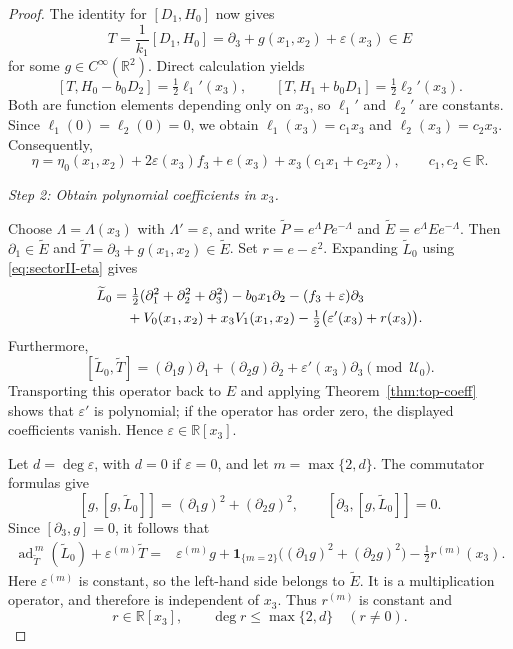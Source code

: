 \documentclass{tCON2e}
\newenvironment{revision}{\begingroup\color{black}}{\endgroup}
\numberwithin{equation}{section}
\theoremstyle{journalplain}
\theoremstyle{journaldef}
\newenvironment{revision}{}{}
\begin{document}
\begin{revision}
\begin{proof}
The identity for $[D_1,H_0]$ now gives
\[
T=\frac1{k_1}[D_1,H_0]
=\partial_3+g(x_1,x_2)+\varepsilon(x_3)\in E
\]
for some $g\in C^\infty(\mathbb R^2)$.
Direct calculation yields
\[
[T,H_0-b_0D_2]=\tfrac12\ell_1'(x_3),
\qquad
[T,H_1+b_0D_1]=\tfrac12\ell_2'(x_3).
\]
Both are function elements depending only on $x_3$,
so $\ell_1'$ and $\ell_2'$ are constants.
Since $\ell_1(0)=\ell_2(0)=0$, we obtain
$\ell_1(x_3)=c_1x_3$ and $\ell_2(x_3)=c_2x_3$.
Consequently,
\begin{equation}
\eta=\eta_0(x_1,x_2)+2\varepsilon(x_3)f_3+e(x_3)
+x_3(c_1x_1+c_2x_2),
\qquad c_1,c_2\in\mathbb R.
\label{eq:sectorII-eta}
\end{equation}

\medskip
\noindent\emph{Step 2: Obtain polynomial coefficients in $x_3$.}

Choose $\Lambda=\Lambda(x_3)$ with $\Lambda'=\varepsilon$,
and write $\widetilde P=e^\Lambda Pe^{-\Lambda}$ and
$\widetilde E=e^\Lambda Ee^{-\Lambda}$.
Then $\partial_1\in\widetilde E$ and
$\widetilde T=\partial_3+g(x_1,x_2)\in\widetilde E$.
Set $r=e-\varepsilon^2$. Expanding $\widetilde L_0$ using
\eqref{eq:sectorII-eta} gives
\begin{align}
\widetilde L_0
&=\tfrac12(\partial_1^2+\partial_2^2+\partial_3^2)
-b_0x_1\partial_2-(f_3+\varepsilon)\partial_3\notag\\
&\quad+V_0(x_1,x_2)+x_3V_1(x_1,x_2)
-\tfrac12\bigl(\varepsilon'(x_3)+r(x_3)\bigr).
\label{eq:sectorII-L}
\end{align}
Furthermore,
\[
[\widetilde L_0,\widetilde T]
=(\partial_1g)\partial_1+(\partial_2g)\partial_2
+\varepsilon'(x_3)\partial_3\pmod{\mathcal U_0}.
\]
Transporting this operator back to $E$ and applying
Theorem~\ref{thm:top-coeff} shows that $\varepsilon'$ is
polynomial; if the operator has order zero, the displayed
coefficients vanish. Hence $\varepsilon\in\mathbb R[x_3]$.

Let $d=\deg\varepsilon$, with $d=0$ if $\varepsilon=0$,
and let $m=\max\{2,d\}$.
The commutator formulas give
\[
[g,[g,\widetilde L_0]]
=(\partial_1g)^2+(\partial_2g)^2,
\qquad
[\partial_3,[g,\widetilde L_0]]=0.
\]
Since $[\partial_3,g]=0$, it follows that
\[
\begin{aligned}
\operatorname{ad}_{\widetilde T}^{\,m}(\widetilde L_0)
+\varepsilon^{(m)}\widetilde T
={}&\varepsilon^{(m)}g
+\mathbf 1_{\{m=2\}}
 \bigl((\partial_1g)^2+(\partial_2g)^2\bigr)-\tfrac12r^{(m)}(x_3).
\end{aligned}
\]
Here $\varepsilon^{(m)}$ is constant, so the left-hand side
belongs to $\widetilde E$. It is a multiplication operator,
and therefore is independent of $x_3$. Thus $r^{(m)}$ is
constant and
\[
r\in\mathbb R[x_3],\qquad
\deg r\le\max\{2,d\}\quad(r\ne0).
\]


\end{proof}
\end{revision}
\end{document}
